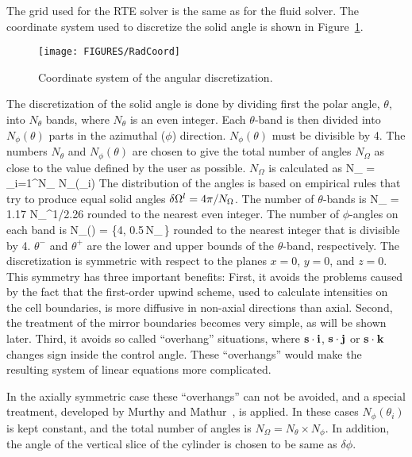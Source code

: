 \documentclass[11pt]{book}
\begin{document}
The grid used for the RTE solver is the same as for the fluid solver.
The coordinate system used to discretize the solid angle is
shown in Figure~\ref{Angular}.
\begin{figure}[ht]
\begin{center}
\texttt{[image: FIGURES/RadCoord]}
\caption{Coordinate system of the angular discretization.}
\label{Angular}
\end{center}
\end{figure}
The discretization of the solid angle is done by dividing first
the polar angle, $\theta$, into $N_{\theta}$ bands, where
$N_{\theta}$ is an even integer.
Each $\theta$-band is then divided into
$N_{\phi}(\theta)$ parts in the azimuthal ($\phi$) direction.
$N_{\phi}(\theta)$ must be divisible by 4.
The numbers $N_{\theta}$ and $N_{\phi}(\theta)$ are chosen
to give the total number of angles $N_{\Omega}$ as close to
the value defined by the user as possible.
$N_{\Omega}$ is calculated as
\be
 N_{\Omega} = \sum_{i=1}^{N_{\theta}} N_{\phi}(\theta_i)
\ee
The distribution of the angles is based on empirical rules that try
to produce equal solid angles $\delta {\Omega}^l = 4\pi/N_{\Omega}$. The
number of $\theta$-bands is
\be
 N_{\theta} = 1.17 \; N_{\Omega}^{1/2.26}
\ee
rounded to the nearest even integer. The number of $\phi$-angles
on each band is
\be
 N_{\phi}(\theta) = \max\left\{4,
        0.5\,N_{\Omega}\,\left[\cos(\theta^-)-\cos(\theta^+)\right]\right\}
\ee
rounded to the nearest integer that is divisible by 4.
$\theta^-$ and $\theta^+$ are
the lower and upper bounds of the $\theta$-band, respectively.
The discretization is symmetric with respect to the planes $x=0$, $y=0$, and
$z=0$. This symmetry has three important benefits:
First, it avoids the problems caused by the fact that the first-order
upwind scheme, used to calculate intensities on the cell boundaries,
is more diffusive in non-axial directions than axial.
Second, the treatment of the mirror boundaries becomes very simple, as
will be shown later. Third,
it avoids so called
``overhang'' situations, where ${\bf s}\cdot {\bf i}$, ${\bf s}\cdot {\bf j}$
or ${\bf s}\cdot {\bf k}$ changes sign inside
the control angle. These ``overhangs'' would make the resulting system of
linear equations more complicated.

In the axially symmetric case these ``overhangs'' can not be avoided, and a
special treatment, developed by Murthy and Mathur~\cite{Murthy}, is
applied. In these cases $N_{\phi}(\theta_i)$ is kept constant, and
the total number of angles is $N_{\Omega} = N_{\theta} \times
N_{\phi}$. In addition, the angle of the vertical slice of the cylinder is
chosen to be same as $\delta\phi$.
\end{document}
